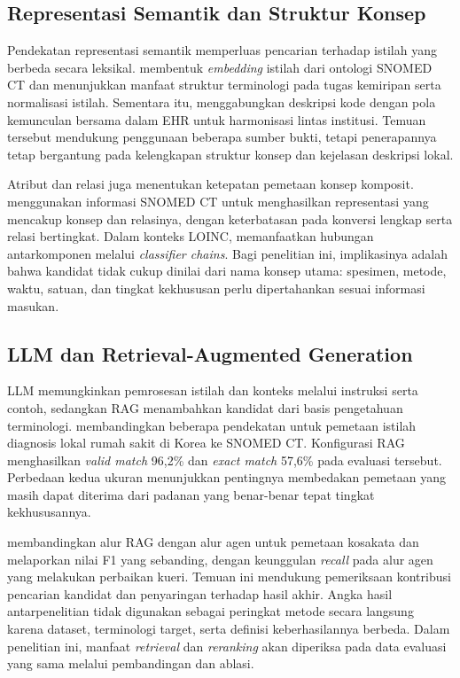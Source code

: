 \subsection{Representasi Semantik dan Struktur Konsep}

Pendekatan representasi semantik memperluas pencarian terhadap istilah yang berbeda secara leksikal. \citet{zahra_obtaining_2024} membentuk \textit{embedding} istilah dari ontologi SNOMED CT dan menunjukkan manfaat struktur terminologi pada tugas kemiripan serta normalisasi istilah. Sementara itu, \citet{zhou_multiview_2022} menggabungkan deskripsi kode dengan pola kemunculan bersama dalam EHR untuk harmonisasi lintas institusi. Temuan tersebut mendukung penggunaan beberapa sumber bukti, tetapi penerapannya tetap bergantung pada kelengkapan struktur konsep dan kejelasan deskripsi lokal.

Atribut dan relasi juga menentukan ketepatan pemetaan konsep komposit. \citet{kate_automatic_2020} menggunakan informasi SNOMED CT untuk menghasilkan representasi yang mencakup konsep dan relasinya, dengan keterbatasan pada konversi lengkap serta relasi bertingkat. Dalam konteks LOINC, \citet{michel-picque_classifier_2024} memanfaatkan hubungan antarkomponen melalui \textit{classifier chains}. Bagi penelitian ini, implikasinya adalah bahwa kandidat tidak cukup dinilai dari nama konsep utama: spesimen, metode, waktu, satuan, dan tingkat kekhususan perlu dipertahankan sesuai informasi masukan.

\subsection{LLM dan Retrieval-Augmented Generation}

LLM memungkinkan pemrosesan istilah dan konteks melalui instruksi serta contoh, sedangkan RAG menambahkan kandidat dari basis pengetahuan terminologi. \citet{huh_comparative_2025} membandingkan beberapa pendekatan untuk pemetaan istilah diagnosis lokal rumah sakit di Korea ke SNOMED CT. Konfigurasi RAG menghasilkan \textit{valid match} 96,2\% dan \textit{exact match} 57,6\% pada evaluasi tersebut. Perbedaan kedua ukuran menunjukkan pentingnya membedakan pemetaan yang masih dapat diterima dari padanan yang benar-benar tepat tingkat kekhususannya.

\citet{de_barros_vanzin_llm-based_2025} membandingkan alur RAG dengan alur agen untuk pemetaan kosakata dan melaporkan nilai F1 yang sebanding, dengan keunggulan \textit{recall} pada alur agen yang melakukan perbaikan kueri. Temuan ini mendukung pemeriksaan kontribusi pencarian kandidat dan penyaringan terhadap hasil akhir. Angka hasil antarpenelitian tidak digunakan sebagai peringkat metode secara langsung karena dataset, terminologi target, serta definisi keberhasilannya berbeda. Dalam penelitian ini, manfaat \textit{retrieval} dan \textit{reranking} akan diperiksa pada data evaluasi yang sama melalui pembandingan dan ablasi.

